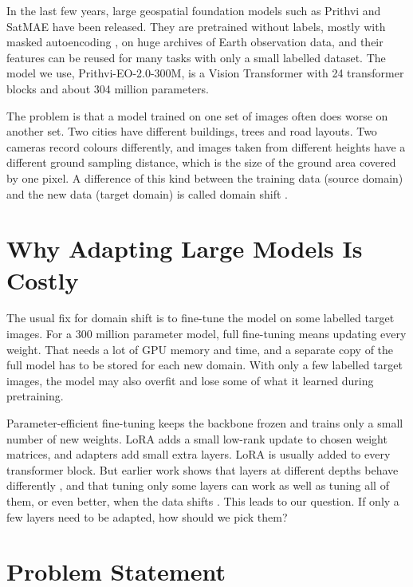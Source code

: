 \documentclass[11pt,a4paper]{report}
\begin{document}
In the last few years, large geospatial foundation models such as Prithvi \cite{jakubik2023foundation,szwarcman2024prithvi} and SatMAE \cite{cong2022satmae} have been released. They are pretrained without labels, mostly with masked autoencoding \cite{he2022masked}, on huge archives of Earth observation data, and their features can be reused for many tasks with only a small labelled dataset. The model we use, Prithvi-EO-2.0-300M, is a Vision Transformer \cite{dosovitskiy2021image} with 24 transformer blocks and about 304 million parameters.

The problem is that a model trained on one set of images often does worse on another set. Two cities have different buildings, trees and road layouts. Two cameras record colours differently, and images taken from different heights have a different ground sampling distance, which is the size of the ground area covered by one pixel. A difference of this kind between the training data (source domain) and the new data (target domain) is called domain shift \cite{bendavid2010theory,tuia2016domain}.

\section{Why Adapting Large Models Is Costly}

The usual fix for domain shift is to fine-tune the model on some labelled target images. For a 300 million parameter model, full fine-tuning means updating every weight. That needs a lot of GPU memory and time, and a separate copy of the full model has to be stored for each new domain. With only a few labelled target images, the model may also overfit and lose some of what it learned during pretraining.

Parameter-efficient fine-tuning keeps the backbone frozen and trains only a small number of new weights. LoRA \cite{hu2022lora} adds a small low-rank update to chosen weight matrices, and adapters \cite{houlsby2019parameter} add small extra layers. LoRA is usually added to every transformer block. But earlier work shows that layers at different depths behave differently \cite{yosinski2014transferable}, and that tuning only some layers can work as well as tuning all of them, or even better, when the data shifts \cite{lee2023surgical}. This leads to our question. If only a few layers need to be adapted, how should we pick them?

\section{Problem Statement}
\end{document}
